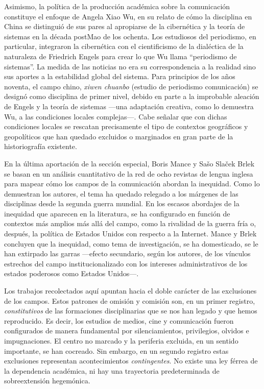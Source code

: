 \documentclass{tufte-handout}
\begin{document}
Asimismo, la política de la producción académica sobre la comunicación
constituye el enfoque de Angela Xiao Wu, en su relato de cómo la
disciplina en China se distinguió de sus pares al apropiarse de la
cibernética y la teoría de sistemas en la década postMao de los ochenta.
Los estudiosos del periodismo, en particular, integraron la cibernética
con el cientificismo de la dialéctica de la naturaleza de Friedrich
Engels para crear lo que Wu llama ``periodismo de sistemas''. La medida
de las noticias no era su correspondencia a la realidad sino sus aportes
a la estabilidad global del sistema. Para principios de los años
noventa, el campo chino, \emph{xiwen chuanbo} (estudio de periodismo
comunicación) se designó como disciplina de primer nivel, debido en
parte a la improbable aleación de Engels y la teoría de sistemas ---una
adaptación creativa, como lo demuestra Wu, a las condiciones locales
complejas---. Cabe señalar que con dichas condiciones locales se
rescatan precisamente el tipo de contextos geográficos y geopolíticos
que han quedado excluidos o marginados en gran parte de la
historiografía existente.

En la última aportación de la sección especial, Boris Mance y Sašo
Slaček Brlek se basan en un análisis cuantitativo de la red de ocho
revistas de lengua inglesa para mapear cómo los campos de la
comunicación abordan la inequidad. Como lo demuestran los autores, el
tema ha quedado relegado a los márgenes de las disciplinas desde la
segunda guerra mundial. En los escasos abordajes de la inequidad que
aparecen en la literatura, se ha configurado en función de contextos más
amplios más allá del campo, como la rivalidad de la guerra fría o,
después, la política de Estados Unidos con respecto a la Internet. Mance
y Brlek concluyen que la inequidad, como tema de investigación, se ha
domesticado, se le han extirpado las garras ---efecto secundario, según
los autores, de los vínculos estrechos del campo institucionalizado con
los intereses administrativos de los estados poderosos como Estados
Unidos---.

Los trabajos recolectados aquí apuntan hacia el doble carácter de las
exclusiones de los campos. Estos patrones de omisión y comisión son, en
un primer registro, \emph{constitutivos} de las formaciones
disciplinarias que se nos han legado y que hemos reproducido. Es decir,
los estudios de medios, cine y comunicación fueron configurados de
manera fundamental por silenciamientos, privilegios, olvidos e
impugnaciones. El centro no marcado y la periferia excluida, en un
sentido importante, se han cocreado. Sin embargo, en un segundo registro
estas exclusiones representan acontecimientos \emph{contingentes}. No
existe una ley férrea de la dependencia académica, ni hay una
trayectoria predeterminada de sobreextensión hegemónica.
\end{document}
